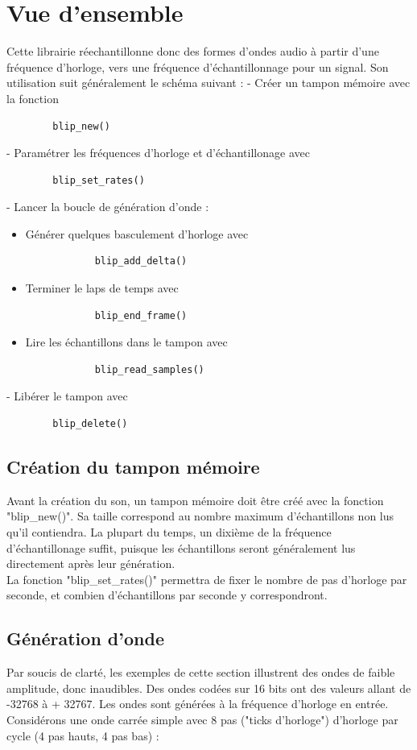 \documentclass{report}
\begin{document}
\section*{Vue d'ensemble}
Cette librairie réechantillonne donc des formes d'ondes audio à partir d'une fréquence d'horloge, vers une fréquence d'échantillonnage pour un signal.
Son utilisation suit généralement le schéma suivant :
- Créer un tampon mémoire avec la fonction 
\begin{lstlisting} 
		blip_new() 
\end{lstlisting}
- Paramétrer les fréquences d'horloge et d'échantillonage avec 
\begin{lstlisting} 
		blip_set_rates() 
\end{lstlisting}
- Lancer la boucle de génération d'onde :
\begin{itemize}
	\item Générer quelques basculement d'horloge avec 
	\begin{lstlisting}
			blip_add_delta()
	\end{lstlisting}
	\item Terminer le laps de temps avec 
	\begin{lstlisting}
			blip_end_frame()
	\end{lstlisting}
	\item Lire les échantillons dans le tampon avec 
	\begin{lstlisting}
			blip_read_samples()
	\end{lstlisting}
\end{itemize}
- Libérer le tampon avec 
\begin{lstlisting}
		blip_delete()
\end{lstlisting}

\subsection{Création du tampon mémoire}
Avant la création du son, un tampon mémoire doit être créé avec la fonction  "blip\_new()". Sa taille correspond au nombre maximum d'échantillons non lus qu'il contiendra. La plupart du temps, un dixième de la fréquence d'échantillonage suffit, puisque les échantillons seront généralement lus directement après leur génération.\\
La fonction "blip\_set\_rates()" permettra de fixer le nombre de pas d'horloge par seconde, et combien d'échantillons par seconde y correspondront. 
\subsection{Génération d'onde}
Par soucis de clarté, les exemples de cette section illustrent des ondes de faible amplitude, donc inaudibles. Des ondes codées sur 16 bits ont des valeurs allant de -32768 à + 32767.
Les ondes sont générées à la fréquence d'horloge en entrée.
Considérons une onde carrée simple avec 8 pas ("ticks d'horloge") d'horloge par cycle (4 pas hauts, 4 pas bas) : 
\end{document}
